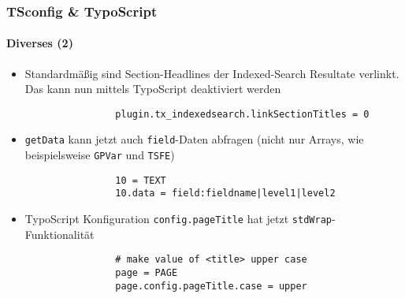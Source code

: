 \begin{frame}[fragile]
	\frametitle{TSconfig \& TypoScript}
	\framesubtitle{Diverses (2)}

	\begin{itemize}

		\item Standardmäßig sind Section-Headlines der Indexed-Search Resultate verlinkt.
			Das kann nun mittels TypoScript deaktiviert werden

			\begin{lstlisting}
				plugin.tx_indexedsearch.linkSectionTitles = 0
			\end{lstlisting}

		\item \texttt{getData} kann jetzt auch \texttt{field}-Daten abfragen (nicht
			nur Arrays, wie beispielsweise \texttt{GPVar} und \texttt{TSFE})

			\begin{lstlisting}
				10 = TEXT
				10.data = field:fieldname|level1|level2
			\end{lstlisting}

		\item TypoScript Konfiguration \texttt{config.pageTitle} hat jetzt \texttt{stdWrap}-Funktionalität

			\begin{lstlisting}
				# make value of <title> upper case
				page = PAGE
				page.config.pageTitle.case = upper
			\end{lstlisting}

	\end{itemize}

\end{frame}

